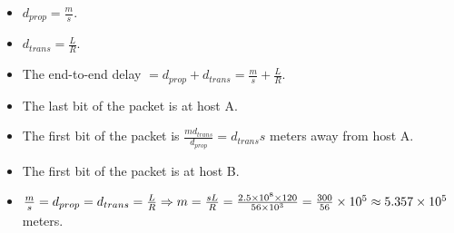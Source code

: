 \begin{pr}$ $
\begin{itemize}
\item $d_{prop}=\frac ms$.
\item $d_{trans}=\frac LR$.
\item The end-to-end delay $=d_{prop}+d_{trans}=\frac ms+\frac LR$.
\item The last bit of the packet is at host A.
\item The first bit of the packet is $\frac{md_{trans}}{d_{prop}}=d_{trans}s$ meters away from host A.
\item The first bit of the packet is at host B.
\item $\frac ms=d_{prop}=d_{trans}=\frac LR\Rightarrow m=\frac{sL}R=\frac{2.5\times10^8\times120}{56\times10^3}=\frac{300}{56}\times10^5\approx5.357\times10^5$ meters.
\end{itemize}
\end{pr}
